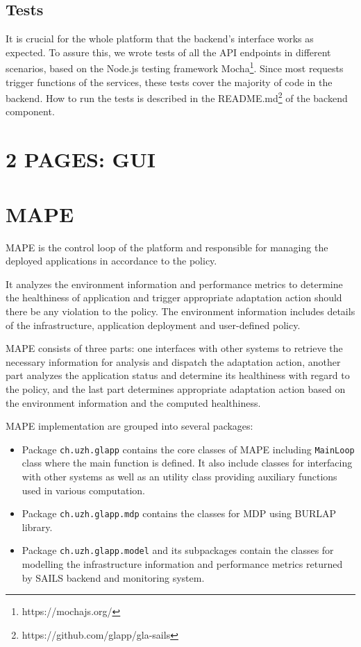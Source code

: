 \documentclass{seal_thesis}
\begin{document}
\subsection{Tests}
It is crucial for the whole platform that the backend's interface works as expected.
To assure this, we wrote tests of all the API endpoints in different scenarios, based on the Node.js testing framework Mocha\footnote{https://mochajs.org/}.
Since most requests trigger functions of the services, these tests cover the majority of code in the backend.
How to run the tests is described in the README.md\footnote{https://github.com/glapp/gla-sails} of the backend component.


\section{2 PAGES: GUI}


\section{MAPE}
MAPE is the control loop of the platform and responsible for managing the deployed applications in accordance to the policy.


It analyzes the environment information and performance metrics to determine the healthiness of application and trigger appropriate adaptation action should there be any violation to the policy.
The environment information includes details of the infrastructure, application deployment and user-defined policy.

MAPE consists of three parts: one interfaces with other systems to retrieve the necessary information for analysis and dispatch the adaptation action, another part analyzes the application status and determine its healthiness with regard to the policy, and the last part determines appropriate adaptation action based on the environment information and the computed healthiness.

MAPE implementation are grouped into several packages:
\begin{itemize}
\item Package \texttt{ch.uzh.glapp} contains the core classes of MAPE including \texttt{MainLoop} class where the main function is defined.
It also include classes for interfacing with other systems as well as an utility class providing auxiliary functions used in various computation. 
\item Package \texttt{ch.uzh.glapp.mdp} contains the classes for MDP using BURLAP library.
\item Package \texttt{ch.uzh.glapp.model} and its subpackages contain the classes for modelling the infrastructure information and performance metrics returned by SAILS backend and monitoring system.
\end{itemize}
\end{document}
